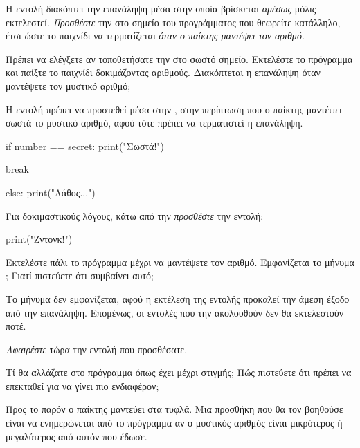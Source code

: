 \documentclass[a4paper,11pt,oneside]{book}
\begin{document}
\begin{step}
Η εντολή  διακόπτει την επανάληψη μέσα στην οποία βρίσκεται \emph{αμέσως} μόλις εκτελεστεί.
\emph{Προσθέστε} την  στο σημείο του προγράμματος που θεωρείτε κατάλληλο, έτσι ώστε το παιχνίδι να τερματίζεται \emph{όταν ο παίκτης μαντέψει τον αριθμό}.

Πρέπει να ελέγξετε αν τοποθετήσατε την  στο σωστό σημείο. Εκτελέστε το πρόγραμμα και παίξτε το παιχνίδι δοκιμάζοντας αριθμούς. Διακόπτεται η επανάληψη όταν μαντέψετε τον μυστικό αριθμό;

\begin{answer}
	Η εντολή  πρέπει να προστεθεί μέσα στην , στην περίπτωση που ο παίκτης μαντέψει σωστά το μυστικό αριθμό, αφού τότε πρέπει να τερματιστεί η επανάληψη.

\clearpage
\begin{pyplain}
    if number == secret:
        print("Σωστά!")
\end{pyplain}
\begin{pynew}
        break
\end{pynew}
\begin{pyplain}
    else:	
        print("Λάθος...")
\end{pyplain}
\end{answer}
\end{step}

\begin{step}
Για δοκιμαστικούς λόγους, κάτω από την  \emph{προσθέστε} την εντολή:

\begin{pynew}
print("Ζντονκ!")
\end{pynew}

Εκτελέστε πάλι το πρόγραμμα μέχρι να μαντέψετε τον αριθμό. Εμφανίζεται το μήνυμα ; Γιατί πιστεύετε ότι συμβαίνει αυτό;

\begin{answer}
Το μήνυμα δεν εμφανίζεται, αφού η εκτέλεση της εντολής  προκαλεί την άμεση έξοδο από την επανάληψη. Επομένως, οι εντολές που την ακολουθούν δεν θα εκτελεστούν ποτέ.
\end{answer}

\emph{Αφαιρέστε} τώρα την εντολή που προσθέσατε.
\end{step}

\begin{step}
Τί θα αλλάζατε στο πρόγραμμα όπως έχει μέχρι στιγμής; Πώς πιστεύετε ότι πρέπει να επεκταθεί για να γίνει πιο ενδιαφέρον;

\begin{answer}
	Προς το παρόν ο παίκτης μαντεύει στα τυφλά. Μια προσθήκη που θα τον βοηθούσε είναι να ενημερώνεται από το πρόγραμμα αν ο μυστικός αριθμός είναι μικρότερος ή μεγαλύτερος από αυτόν που έδωσε.
\end{answer}

\end{step}
\end{document}
